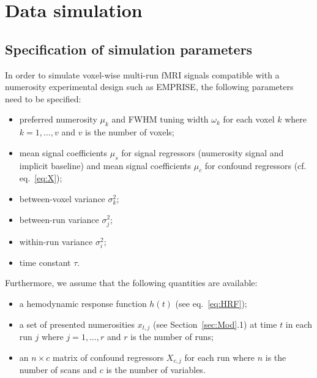 \documentclass[a4paper,12pt]{article}
\begin{document}
\pagebreak
\section{Data simulation} \label{sec:Sim}

\subsection{Specification of simulation parameters}

In order to simulate voxel-wise multi-run fMRI signals compatible with a numerosity experimental design such as EMPRISE, the following parameters need to be specified:

\begin{itemize}
	
\item preferred numerosity $\mu_k$ and FWHM tuning width $\omega_k$ for each voxel $k$ where $k = 1,\ldots,v$ and $v$ is the number of voxels;

\item mean signal coefficients $\mu_s$ for signal regressors (numerosity signal and implicit baseline) and mean signal coefficients $\mu_c$ for confound regressors (cf. eq.~\ref{eq:X});

\item between-voxel variance $\sigma_k^2$;

\item between-run variance $\sigma_j^2$;

\item within-run variance $\sigma_i^2$;

\item time constant $\tau$.

\end{itemize}

Furthermore, we assume that the following quantities are available:

\begin{itemize}

\item a hemodynamic response function $h(t)$ (see eq.~\ref{eq:HRF});

\item a set of presented numerosities $x_{t,j}$ (see Section~\ref{sec:Mod}.1) at time $t$ in each run $j$ where $j = 1,\ldots,r$ and $r$ is the number of runs;

\item an $n \times c$ matrix of confound regressors $X_{c,j}$ for each run where $n$ is the number of scans and $c$ is the number of variables.
	
\end{itemize}
\end{document}
